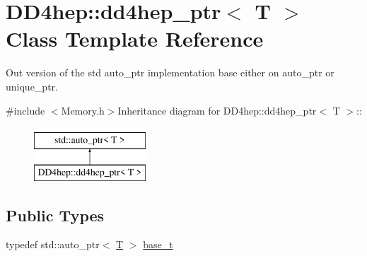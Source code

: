 \hypertarget{class_d_d4hep_1_1dd4hep__ptr}{
\section{DD4hep::dd4hep\_\-ptr$<$ T $>$ Class Template Reference}
\label{class_d_d4hep_1_1dd4hep__ptr}
}


Out version of the std auto\_\-ptr implementation base either on auto\_\-ptr or unique\_\-ptr.  


{\ttfamily \#include $<$Memory.h$>$}Inheritance diagram for DD4hep::dd4hep\_\-ptr$<$ T $>$::\begin{figure}[H]
\begin{center}
\leavevmode
\includegraphics[height=2cm]{class_d_d4hep_1_1dd4hep__ptr}
\end{center}
\end{figure}
\subsection*{Public Types}
\begin{DoxyCompactItemize}
\item 
typedef std::auto\_\-ptr$<$ \hyperlink{class_t}{T} $>$ \hyperlink{class_d_d4hep_1_1dd4hep__ptr_a4bcbed2d2a920d0a5ffbf405263fe8d6}{base\_\-t}
\end{DoxyCompactItemize}
